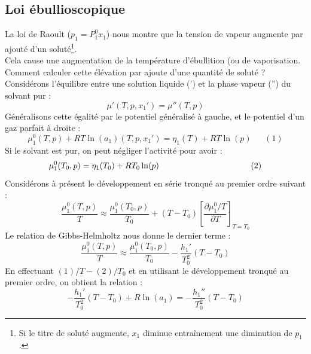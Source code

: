 \documentclass[11pt, a4paper, openany]{book}
\begin{document}
\subsection{Loi ébullioscopique}
La loi de Raoult ($p_1 = P_1^0x_1$) nous montre que la tension de vapeur augmente par ajouté d'un soluté\footnote{Si le titre de soluté augmente, $x_1$ diminue entraînement une diminution de $p_1$.}. \\
Cela cause une augmentation de la température d'ébullition (ou de vaporisation. Comment calculer cette élévation par ajoute d'une quantité de soluté ? Considérons l'équilibre entre une solution liquide (') et la phase vapeur ('') du solvant pur :
\begin{equation}
\mu'(T,p,x_1') = \mu ''(T,p)
\end{equation}
Généralisons cette égalité par le potentiel généralisé à gauche, et le potentiel d'un gaz parfait à droite :
\begin{equation}
\mu_1^0(T,p) + RT\ln(a_1)(T,p,x_1') = \eta_1(T) + RT\ln(p)\ \ \ \ \ \ \ (1)
\end{equation}
Si le solvant est pur, on peut négliger l'activité pour avoir : 
\begin{equation}
\mu_1^0(T_0,p) = \eta_1(T_0) + RT_0\ln(p)\ \ \ \ \ \ \ \ \ \ \ \ \ \ \ \ \ \ \ \ \ \  \ \ \ \ \ \\ \ \ \ \ \ \ \ (2)
\end{equation}
Considérons à présent le développement en série tronqué au premier ordre suivant : 
\begin{equation}
\frac{\mu_1^0(T,p)}{T} \approx \frac{\mu_1^0(T_0,p)}{T_0} + (T-T_0)\left[\frac{\partial \mu_1^0 / T}{\partial T}\right]_{T = T_0}
\end{equation}
Le relation de Gibbs-Helmholtz nous donne le dernier terme :
\begin{equation}
\frac{\mu_1^0(T,p)}{T} \approx \frac{\mu_1^0(T_0,p)}{T_0}- \frac{h_1'}{T_0^2} (T-T_0)
\end{equation}
En effectuant $(1)/T - (2)/T_0$ et en utilisant le développement tronqué au premier ordre, on obtient la relation :
\begin{equation}
-\frac{h_1'}{T_0^2}(T-T_0) + R\ln(a_1) = -\frac{h_1''}{T_0^2}(T-T_0)
\end{equation}
\end{document}
